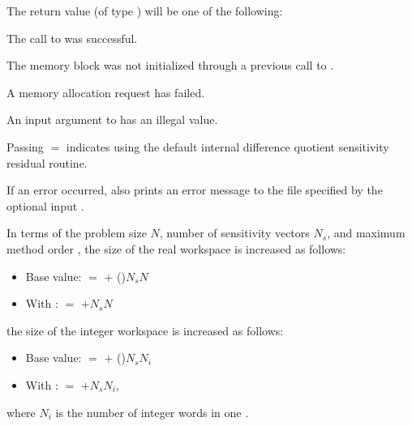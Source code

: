 {
  The return value  (of type ) will be one of the following:
  \begin{args}
  \item[\Id{IDA\_SUCCESS}]
    The call to  was successful.
  \item[\Id{IDA\_MEM\_NULL}] 
    The {\idas} memory block was not initialized through a 
    previous call to .
  \item[\Id{IDA\_MEM\_FAIL}] 
    A memory allocation request has failed.
  \item[\Id{IDA\_ILL\_INPUT}] 
    An input argument to  has an illegal value.
  \end{args}
}
{
  Passing $=$ indicates using the default internal difference 
  quotient sensitivity residual routine.

  If an error occurred,  also prints an error message to the
  file specified by the optional input .
}
In terms of the problem size $N$, number of sensitivity vectors $N_s$, and maximum method 
order , the size of the real workspace is increased as follows:
\begin{itemize}
\item Base value:  $=$  $+$ ()$N_s N$
\item With : 
   $=$  $+ N_s N$ 
\end{itemize}
the size of the integer workspace is increased as follows:
\begin{itemize}
\item Base value:  $=$  $+$ ()$N_s N_i$
\item With :  $=$  $+ N_s N_i$, 
\end{itemize}
where $N_i$ is the number of integer words in one .

